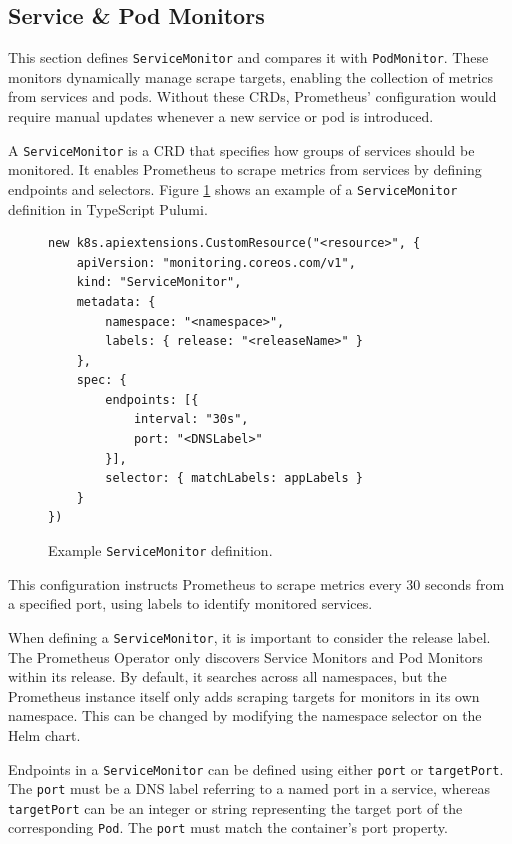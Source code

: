 \subsection{Service \& Pod Monitors}
This section defines \texttt{ServiceMonitor} and compares it with \texttt{PodMonitor}. These monitors dynamically manage scrape targets, enabling the collection of metrics from services and pods. Without these CRDs, Prometheus' configuration would require manual updates whenever a new service or pod is introduced.

A \texttt{ServiceMonitor} is a CRD that specifies how groups of services should be monitored. It enables Prometheus to scrape metrics from services by defining endpoints and selectors. Figure \ref{fig:servicemonitor_example} shows an example of a \texttt{ServiceMonitor} definition in TypeScript Pulumi.

\begin{figure}[h]
    \centering
\begin{verbatim}
new k8s.apiextensions.CustomResource("<resource>", {
    apiVersion: "monitoring.coreos.com/v1",
    kind: "ServiceMonitor",
    metadata: {
        namespace: "<namespace>",
        labels: { release: "<releaseName>" }
    },
    spec: {
        endpoints: [{ 
            interval: "30s", 
            port: "<DNSLabel>" 
        }],
        selector: { matchLabels: appLabels }
    }
})
\end{verbatim}
    \caption{Example \texttt{ServiceMonitor} definition.}
    \label{fig:servicemonitor_example}
\end{figure}

This configuration instructs Prometheus to scrape metrics every 30 seconds from a specified port, using labels to identify monitored services.

When defining a \texttt{ServiceMonitor}, it is important to consider the release label. The Prometheus Operator only discovers Service Monitors and Pod Monitors within its release. By default, it searches across all namespaces, but the Prometheus instance itself only adds scraping targets for monitors in its own namespace. This can be changed by modifying the namespace selector on the Helm chart.

Endpoints in a \texttt{ServiceMonitor} can be defined using either \texttt{port} or \texttt{targetPort}. The \texttt{port} must be a DNS label referring to a named port in a service, whereas \texttt{targetPort} can be an integer or string representing the target port of the corresponding \texttt{Pod}. The \texttt{port} must match the container's port property.

